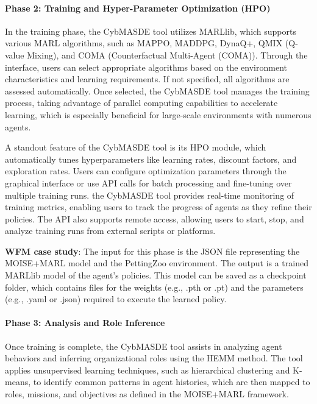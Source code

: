 \documentclass[sigconf,anonymous]{aamas}
\begin{document}
\paragraph{Phase 2: Training and Hyper-Parameter Optimization (HPO)}

In the training phase, the CybMASDE tool utilizes MARLlib, which supports various MARL algorithms, such as MAPPO, MADDPG, DynaQ+, QMIX (Q-value Mixing), and COMA (Counterfactual Multi-Agent (COMA)). Through the interface, users can select appropriate algorithms based on the environment characteristics and learning requirements. If not specified, all algorithms are assessed automatically. Once selected, the CybMASDE tool manages the training process, taking advantage of parallel computing capabilities to accelerate learning, which is especially beneficial for large-scale environments with numerous agents.

A standout feature of the CybMASDE tool is its HPO module, which automatically tunes hyperparameters like learning rates, discount factors, and exploration rates. Users can configure optimization parameters through the graphical interface or use API calls for batch processing and fine-tuning over multiple training runs. the CybMASDE tool provides real-time monitoring of training metrics, enabling users to track the progress of agents as they refine their policies. The API also supports remote access, allowing users to start, stop, and analyze training runs from external scripts or platforms.

\textbf{WFM case study}: The input for this phase is the JSON file representing the MOISE+MARL model and the PettingZoo environment. The output is a trained MARLlib model of the agent's policies. This model can be saved as a checkpoint folder, which contains files for the weights (e.g., .pth or .pt) and the parameters (e.g., .yaml or .json) required to execute the learned policy.

\paragraph{Phase 3: Analysis and Role Inference}

Once training is complete, the CybMASDE tool assists in analyzing agent behaviors and inferring organizational roles using the HEMM method. The tool applies unsupervised learning techniques, such as hierarchical clustering and K-means, to identify common patterns in agent histories, which are then mapped to roles, missions, and objectives as defined in the MOISE+MARL framework.
\end{document}

